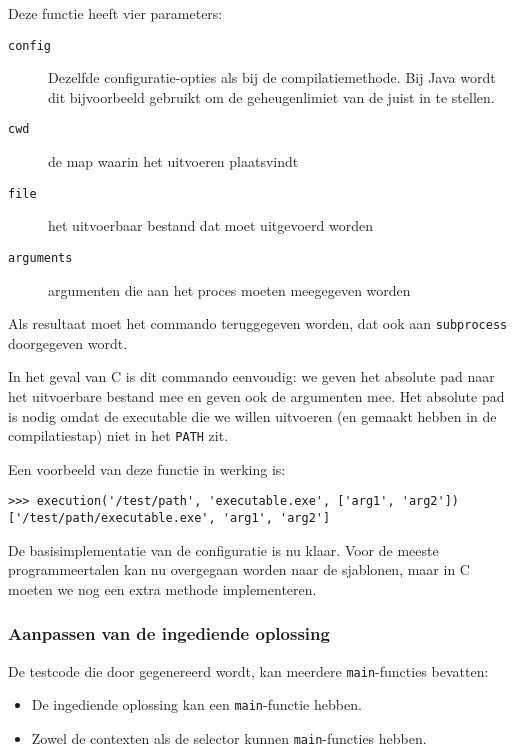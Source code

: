 \inputminted[firstline=19,lastline=22,gobble=4]{python}{sources/c-config.py}

Deze functie heeft vier parameters:

\begin{description}
    \item[\texttt{config}] Dezelfde configuratie-opties als bij de compilatiemethode. 
    Bij Java wordt dit bijvoorbeeld gebruikt om de geheugenlimiet van de  juist in te stellen.
    \item[\texttt{cwd}] de map waarin het uitvoeren plaatsvindt
    \item[\texttt{file}] het uitvoerbaar bestand dat moet uitgevoerd worden
    \item[\texttt{arguments}] argumenten die aan het proces moeten meegegeven worden
\end{description}

Als resultaat moet het commando teruggegeven worden, dat ook aan \texttt{subprocess} doorgegeven wordt.

In het geval van C is dit commando eenvoudig: we geven het absolute pad naar het uitvoerbare bestand mee en geven ook de argumenten mee.
Het absolute pad is nodig omdat de executable die we willen uitvoeren (en gemaakt hebben in de compilatiestap) niet in het \texttt{PATH} zit.

Een voorbeeld van deze functie in werking is:

\begin{verbatim}
>>> execution('/test/path', 'executable.exe', ['arg1', 'arg2'])
['/test/path/executable.exe', 'arg1', 'arg2']
\end{verbatim}

De basisimplementatie van de configuratie is nu klaar.
Voor de meeste programmeertalen kan nu overgegaan worden naar de sjablonen, maar in C moeten we nog een extra methode implementeren.

\subsubsection{Aanpassen van de ingediende oplossing}

De testcode die door \tested{} gegenereerd wordt, kan meerdere \texttt{main}-functies bevatten:

\begin{itemize}
    \item De ingediende oplossing kan een \texttt{main}-functie hebben.
    \item Zowel de contexten als de selector kunnen \texttt{main}-functies hebben.
\end{itemize}

